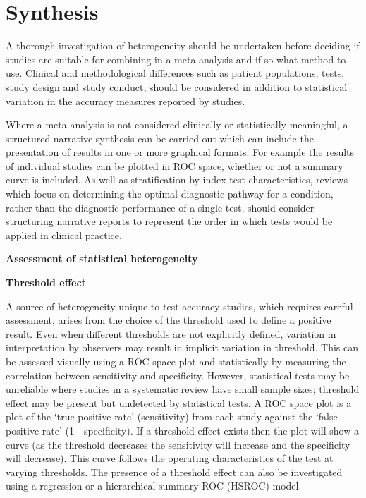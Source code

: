 \documentclass[
  10pt,
  a4paper,
  DIV=11,
  numbers=noendperiod]{scrreprt}
\begin{document}
\section{Synthesis}\label{synthesis-2}

A thorough investigation of heterogeneity should be undertaken before
deciding if studies are suitable for combining in a meta-analysis and if
so what method to use. Clinical and methodological differences such as
patient populations, tests, study design and study conduct, should be
considered in addition to statistical variation in the accuracy measures
reported by studies.

Where a meta-analysis is not considered clinically or statistically
meaningful, a structured narrative synthesis can be carried out which
can include the presentation of results in one or more graphical
formats. For example the results of individual studies can be plotted in
ROC space, whether or not a summary curve is included. As well as
stratification by index test characteristics, reviews which focus on
determining the optimal diagnostic pathway for a condition, rather than
the diagnostic performance of a single test, should consider structuring
narrative reports to represent the order in which tests would be applied
in clinical practice.

\textbf{Assessment of statistical heterogeneity}

\textbf{Threshold effect}

A source of heterogeneity unique to test accuracy studies, which
requires careful assessment, arises from the choice of the threshold
used to define a positive result. Even when different thresholds are not
explicitly defined, variation in interpretation by observers may result
in implicit variation in threshold. This can be assessed visually using
a ROC space plot and statistically by measuring the correlation between
sensitivity and specificity. However, statistical tests may be
unreliable where studies in a systematic review have small sample sizes;
threshold effect may be present but undetected by statistical tests. A
ROC space plot is a plot of the `true positive rate' (sensitivity) from
each study against the `false positive rate' (1 - specificity). If a
threshold effect exists then the plot will show a curve (as the
threshold decreases the sensitivity will increase and the specificity
will decrease). This curve follows the operating characteristics of the
test at varying thresholds. The presence of a threshold effect can also
be investigated using a regression or a hierarchical summary ROC (HSROC)
model.
\end{document}

